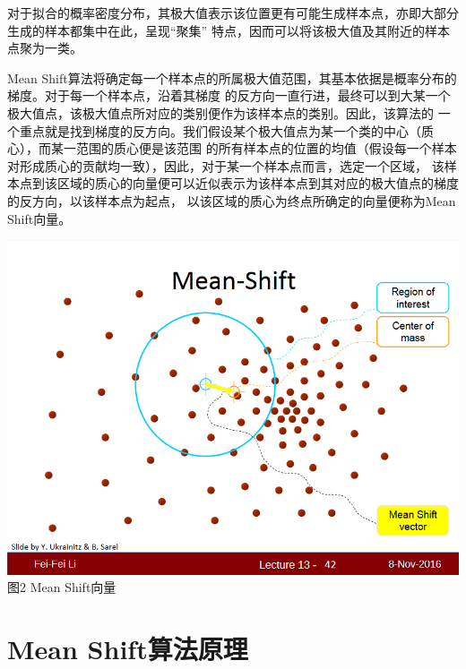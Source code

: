 \documentclass{article}
\begin{document}
对于拟合的概率密度分布，其极大值表示该位置更有可能生成样本点，亦即大部分生成的样本都集中在此，呈现“聚集”
特点，因而可以将该极大值及其附近的样本点聚为一类。

Mean Shift算法将确定每一个样本点的所属极大值范围，其基本依据是概率分布的梯度。对于每一个样本点，沿着其梯度
的反方向一直行进，最终可以到大某一个极大值点，该极大值点所对应的类别便作为该样本点的类别。因此，该算法的
一个重点就是找到梯度的反方向。我们假设某个极大值点为某一个类的中心（质心），而某一范围的质心便是该范围
的所有样本点的位置的均值（假设每一个样本对形成质心的贡献均一致），因此，对于某一个样本点而言，选定一个区域，
该样本点到该区域的质心的向量便可以近似表示为该样本点到其对应的极大值点的梯度的反方向，以该样本点为起点，
以该区域的质心为终点所确定的向量便称为Mean Shift向量。

\begin{center}
    \includegraphics[width=\textwidth]{Images/MeanShift1.png}
    图2 Mean Shift向量
\end{center}

\section{Mean Shift算法原理}
\end{document}
